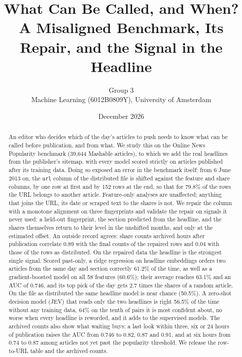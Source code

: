 \documentclass[10pt,a4paper,twocolumn]{article}
\title{What Can Be Called, and When?\\
A Misaligned Benchmark, Its Repair, and the Signal in the Headline}
\author{Group 3 \\ Machine Learning (6012B0809Y), University of Amsterdam}
\date{December 2026}
\begin{document}
\maketitle

\begin{abstract}
An editor who decides which of the day's articles to push needs to know what can be called before publication,
and from what. We study this on the Online News Popularity benchmark (39{,}644 Mashable articles), to which we add
the real headlines from the publisher's sitemap, with every model scored strictly on articles published after its
training data. Doing so exposed an error in the benchmark itself: from 6 June 2013 on, the \texttt{url} column of
the distributed file is shifted against the feature and share columns, by one row at first and by 152 rows at the
end, so that for 79.8\% of the rows the URL belongs to another article. Feature-only analyses are unaffected; anything that joins the URL, its date or scraped text to the shares is not. We repair the
column with a monotone alignment on three fingerprints and validate the repair on signals it never used: a
held-out fingerprint, the section predicted from the headline, and the shares themselves return to their
level in the unshifted months, and only at the estimated offset. An outside record agrees: share counts archived hours after publication correlate 0.89 with the final counts of the repaired rows and 0.04 with those of the rows as distributed. On the repaired data the headline is the strongest single signal. Scored past-only, a ridge
regression on headline embeddings orders two articles from the same day and section correctly 61.2\% of the time,
as well as a gradient-boosted model on all 58 features (60.6\%); their average reaches 63.1\% and an AUC of 0.746,
and its top pick of the day gets 2.7 times the shares of a random article. On the file as distributed the same
headline model is near chance (50.5\%). A zero-shot decision model (JEV) that reads only the two headlines is right
56.5\% of the time without any training data, 64\% on the tenth of pairs it is most confident about, no worse when
every headline is reworded, and it adds to the supervised models. The archived counts also show what waiting buys: a last look within three, six or 24 hours of publication raises the AUC from 0.746 to 0.82, 0.87 and 0.91, and at six hours from 0.74 to 0.87 among articles not yet past the popularity threshold. We release the row-to-URL table and the archived counts.
\end{abstract}
\end{document}
